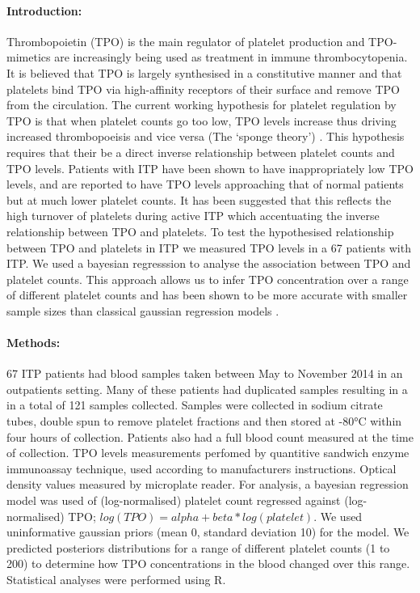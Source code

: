\documentclass[11pt]{article}
\title{}
\author{George Adams .... Nichola Cooper}
\date{July 2018}
\begin{document}
\maketitle

\paragraph{Introduction:} Thrombopoietin (TPO) is the main regulator of platelet production and TPO-mimetics are increasingly being used as treatment in immune thrombocytopenia. It is believed that TPO is largely synthesised in a constitutive manner and that platelets bind TPO via high-affinity receptors of their surface and remove TPO from the circulation. The current working hypothesis for platelet regulation by TPO is that when platelet counts go too low, TPO levels increase thus driving increased thrombopoeisis and vice versa (The `sponge theory') \cite{EtoLinkagemechanismsthrombocytopenia2016}. This hypothesis requires that their be a direct inverse relationship between platelet counts and TPO levels. Patients with ITP have been shown to have inappropriately low TPO levels, and are reported to have TPO levels approaching that of normal patients but at much lower platelet counts. It has been suggested that this reflects the high turnover of platelets during active ITP which accentuating the inverse relationship between TPO and platelets. To test the hypothesised relationship between TPO and platelets in ITP we measured TPO levels in a 67 patients with ITP. We used a bayesian regresssion to analyse the association between TPO and platelet counts. This approach allows us to infer TPO concentration over a range of different platelet counts and has been shown to be more accurate with smaller sample sizes than classical gaussian regression models \cite{GoldsteinBayesiananalysisregression1976}.


\paragraph{Methods:} 67 ITP patients had blood samples taken between May to November 2014 in an outpatients setting. Many of these patients had duplicated samples resulting in a in a total of 121 samples collected. Samples were collected in sodium citrate tubes, double spun to remove platelet fractions and then stored at -80°C within four hours of collection. Patients also had a full blood count measured at the time of collection. TPO levels measurements perfomed by quantitive sandwich enzyme immunoassay technique, used according to manufacturers instructions. Optical density values measured by microplate reader. For analysis, a bayesian regression model was used of (log-normalised) platelet count regressed against (log-normalised) TPO; $log(TPO) = alpha + beta*log(platelet)$. We used uninformative gaussian priors (mean 0, standard deviation 10) for the model. We predicted posteriors distributions for a range of different platelet counts (1 to 200) to determine how TPO concentrations in the blood changed over this range. Statistical analyses were performed using R.
\end{document}
